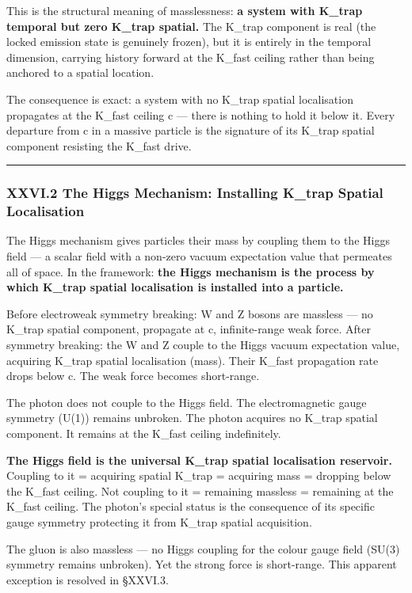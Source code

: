 \documentclass[12pt,a4paper]{article}
\begin{document}
This is the structural meaning of masslessness: \textbf{a system with K\_trap temporal but zero K\_trap spatial.} The K\_trap component is real (the locked emission state is genuinely frozen), but it is entirely in the temporal dimension, carrying history forward at the K\_fast ceiling rather than being anchored to a spatial location.

The consequence is exact: a system with no K\_trap spatial localisation propagates at the K\_fast ceiling c --- there is nothing to hold it below it. Every departure from c in a massive particle is the signature of its K\_trap spatial component resisting the K\_fast drive.

\begin{center}
\rule{0.5\textwidth}{0.4pt}
\end{center}

\subsubsection{XXVI.2 The Higgs Mechanism: Installing K\_trap Spatial Localisation}

The Higgs mechanism gives particles their mass by coupling them to the Higgs field --- a scalar field with a non-zero vacuum expectation value that permeates all of space. In the framework: \textbf{the Higgs mechanism is the process by which K\_trap spatial localisation is installed into a particle.}

Before electroweak symmetry breaking: W and Z bosons are massless --- no K\_trap spatial component, propagate at c, infinite-range weak force. After symmetry breaking: the W and Z couple to the Higgs vacuum expectation value, acquiring K\_trap spatial localisation (mass). Their K\_fast propagation rate drops below c. The weak force becomes short-range.

The photon does not couple to the Higgs field. The electromagnetic gauge symmetry (U(1)) remains unbroken. The photon acquires no K\_trap spatial component. It remains at the K\_fast ceiling indefinitely.

\textbf{The Higgs field is the universal K\_trap spatial localisation reservoir.} Coupling to it = acquiring spatial K\_trap = acquiring mass = dropping below the K\_fast ceiling. Not coupling to it = remaining massless = remaining at the K\_fast ceiling. The photon's special status is the consequence of its specific gauge symmetry protecting it from K\_trap spatial acquisition.

The gluon is also massless --- no Higgs coupling for the colour gauge field (SU(3) symmetry remains unbroken). Yet the strong force is short-range. This apparent exception is resolved in §XXVI.3.
\end{document}
